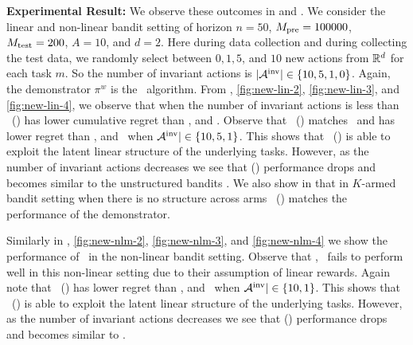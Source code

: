 



\textbf{Experimental Result:} We observe these outcomes in  and . We consider the linear and non-linear bandit setting of horizon $n=50$, $M_{\text{pre}} = 100000$, $M_{\text{test}} = 200$, $A=10$, and $d=2$. 
%
Here during data collection and during collecting the test data, we randomly select between $0, 1, 5$, and $10$ new actions from $\mathbb{R}^d$ for each task $m$. 
%
So the number of invariant actions is $|\mathcal{A}^{\text{inv}}| \in \{10, 5, 1, 0\}$. 
%
Again, the demonstrator $\pi^w$ is the \ts\ algorithm. From , \ref{fig:new-lin-2}, \ref{fig:new-lin-3}, and \ref{fig:new-lin-4}, we observe that when the number of invariant actions is less than \pred\ (\gt) has lower cumulative regret than \dptg, and \ad. 
%
%
Observe that \pred\ (\gt) matches \linucb\ and has lower regret than \dptg, and \ad\ when $\mathcal{A}^{\text{inv}}| \in \{10, 5, 1\}$. This shows that \pred\ (\gt) is able to exploit the latent linear structure of the underlying tasks. However, as the number of invariant actions decreases we see that \pred (\gt) performance drops and becomes similar to the unstructured bandits \ts. We also show in  that in $K$-armed bandit setting when there is no structure across arms \pred\ (\gt) matches the performance of the demonstrator. 
%

Similarly in , \ref{fig:new-nlm-2}, \ref{fig:new-nlm-3}, and \ref{fig:new-nlm-4} we show the performance of \pred\ in the non-linear bandit setting. Observe that \linucb, \mlin\ fails to perform well in this non-linear setting due to their assumption of linear rewards. Again note that \pred\ (\gt) has lower regret than \dptg, and \ad\ when $\mathcal{A}^{\text{inv}}| \in \{10, 1\}$. This shows that \pred\ (\gt) is able to exploit the latent linear structure of the underlying tasks. However, as the number of invariant actions decreases we see that \pred (\gt) performance drops and becomes similar to \ad.


